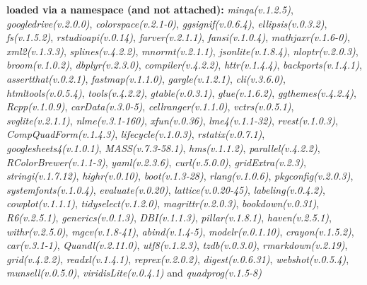 \documentclass[
  bookmarksnumbered]{article}
\begin{document}
\textbf{loaded via a namespace (and not attached):}
\emph{minqa(v.1.2.5)}, \emph{googledrive(v.2.0.0)}, \emph{colorspace(v.2.1-0)}, \emph{ggsignif(v.0.6.4)}, \emph{ellipsis(v.0.3.2)}, \emph{fs(v.1.5.2)}, \emph{rstudioapi(v.0.14)}, \emph{farver(v.2.1.1)}, \emph{fansi(v.1.0.4)}, \emph{mathjaxr(v.1.6-0)}, \emph{xml2(v.1.3.3)}, \emph{splines(v.4.2.2)}, \emph{mnormt(v.2.1.1)}, \emph{jsonlite(v.1.8.4)}, \emph{nloptr(v.2.0.3)}, \emph{broom(v.1.0.2)}, \emph{dbplyr(v.2.3.0)}, \emph{compiler(v.4.2.2)}, \emph{httr(v.1.4.4)}, \emph{backports(v.1.4.1)}, \emph{assertthat(v.0.2.1)}, \emph{fastmap(v.1.1.0)}, \emph{gargle(v.1.2.1)}, \emph{cli(v.3.6.0)}, \emph{htmltools(v.0.5.4)}, \emph{tools(v.4.2.2)}, \emph{gtable(v.0.3.1)}, \emph{glue(v.1.6.2)}, \emph{ggthemes(v.4.2.4)}, \emph{Rcpp(v.1.0.9)}, \emph{carData(v.3.0-5)}, \emph{cellranger(v.1.1.0)}, \emph{vctrs(v.0.5.1)}, \emph{svglite(v.2.1.1)}, \emph{nlme(v.3.1-160)}, \emph{xfun(v.0.36)}, \emph{lme4(v.1.1-32)}, \emph{rvest(v.1.0.3)}, \emph{CompQuadForm(v.1.4.3)}, \emph{lifecycle(v.1.0.3)}, \emph{rstatix(v.0.7.1)}, \emph{googlesheets4(v.1.0.1)}, \emph{MASS(v.7.3-58.1)}, \emph{hms(v.1.1.2)}, \emph{parallel(v.4.2.2)}, \emph{RColorBrewer(v.1.1-3)}, \emph{yaml(v.2.3.6)}, \emph{curl(v.5.0.0)}, \emph{gridExtra(v.2.3)}, \emph{stringi(v.1.7.12)}, \emph{highr(v.0.10)}, \emph{boot(v.1.3-28)}, \emph{rlang(v.1.0.6)}, \emph{pkgconfig(v.2.0.3)}, \emph{systemfonts(v.1.0.4)}, \emph{evaluate(v.0.20)}, \emph{lattice(v.0.20-45)}, \emph{labeling(v.0.4.2)}, \emph{cowplot(v.1.1.1)}, \emph{tidyselect(v.1.2.0)}, \emph{magrittr(v.2.0.3)}, \emph{bookdown(v.0.31)}, \emph{R6(v.2.5.1)}, \emph{generics(v.0.1.3)}, \emph{DBI(v.1.1.3)}, \emph{pillar(v.1.8.1)}, \emph{haven(v.2.5.1)}, \emph{withr(v.2.5.0)}, \emph{mgcv(v.1.8-41)}, \emph{abind(v.1.4-5)}, \emph{modelr(v.0.1.10)}, \emph{crayon(v.1.5.2)}, \emph{car(v.3.1-1)}, \emph{Quandl(v.2.11.0)}, \emph{utf8(v.1.2.3)}, \emph{tzdb(v.0.3.0)}, \emph{rmarkdown(v.2.19)}, \emph{grid(v.4.2.2)}, \emph{readxl(v.1.4.1)}, \emph{reprex(v.2.0.2)}, \emph{digest(v.0.6.31)}, \emph{webshot(v.0.5.4)}, \emph{munsell(v.0.5.0)}, \emph{viridisLite(v.0.4.1)} and \emph{quadprog(v.1.5-8)}
\end{document}
